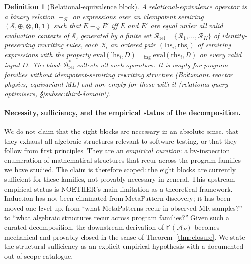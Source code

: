 \documentclass[manuscript]{acmart}
\newtheorem{definition}{Definition}
\begin{document}
\begin{definition}[Relational-equivalence block]
\label{def:b-rel}
A \emph{relational-equivalence operator} is a binary relation $\equiv_{\mathcal{R}}$ on expressions over an idempotent semiring $(\mathcal{S}, \oplus, \otimes, \mathbf{0}, \mathbf{1})$ such that $E \equiv_{\mathcal{R}} E'$ iff $E$ and $E'$ are equal under all valid evaluation contexts of $\mathcal{S}$, generated by a finite set $\mathcal{R}_{\mathrm{rel}} = \{\mathcal{R}_1, \dots, \mathcal{R}_K\}$ of identity-preserving rewriting rules, each $\mathcal{R}_i$ an ordered pair $(\mathrm{lhs}_i, \mathrm{rhs}_i)$ of semiring expressions with the property $\mathrm{eval}(\mathrm{lhs}_i, D) =_{\mathrm{bag}} \mathrm{eval}(\mathrm{rhs}_i, D)$ on every valid input $D$. The block $\mathcal{B}^{*}_{\mathrm{rel}}$ collects all such operators. It is empty for program families without idempotent-semiring rewriting structure (Boltzmann reactor physics, equivariant ML) and non-empty for those with it (relational query optimisers, \S\ref{subsec:third-domain}).
\end{definition}

\paragraph{Necessity, sufficiency, and the empirical status of the decomposition.} We do not claim that the eight blocks are necessary in an absolute sense, that they exhaust all algebraic structures relevant to software testing, or that they follow from first principles. They are an \emph{empirical curation}: a by-inspection enumeration of mathematical structures that recur across the program families we have studied. The claim is therefore scoped: the eight blocks are currently sufficient for these families, not provably necessary in general. This upstream empirical status is NOETHER's main limitation as a theoretical framework. Induction has not been eliminated from MetaPattern discovery; it has been moved one level up, from ``what MetaPatterns recur in observed MR samples?'' to ``what algebraic structures recur across program families?'' Given such a curated decomposition, the downstream derivation of $\mathbb{M}(\mathcal{A}_P)$ becomes mechanical and provably closed in the sense of Theorem~\ref{thm:closure}. We state the structural sufficiency as an explicit empirical hypothesis with a documented out-of-scope catalogue.
\end{document}
